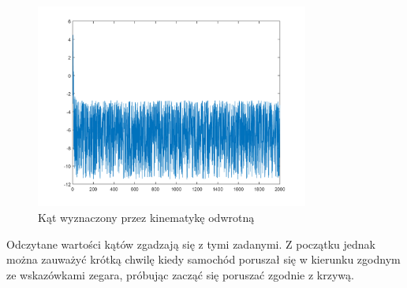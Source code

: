 \documentclass[a4paper, 12pt]{report}
\begin{document}
				\begin{figure}[H]
					\centering
					\includegraphics[width = 0.8\textwidth]{./AP/img/random_left_in_3.png}
					\caption{Kąt wyznaczony przez kinematykę odwrotną}
				\end{figure}
				\noindent Odczytane wartości kątów zgadzają się z tymi zadanymi. Z początku jednak można zauważyć krótką chwilę kiedy samochód poruszał się w kierunku zgodnym ze wskazówkami zegara, próbując zacząć się poruszać zgodnie z krzywą.
			\newpage
\end{document}

